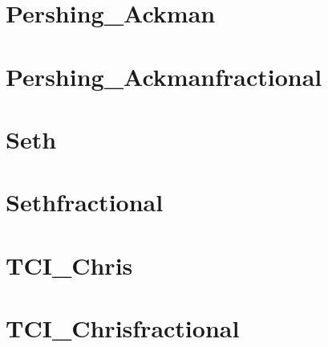 \documentclass[letterpaper,10pt,english]{sphinxmanual}
\begin{document}
\sphinxstepscope


\chapter{Pershing\_Ackman}
\label{\detokenize{Pershing_Ackman2021-09-30:pershing-ackman}}\label{\detokenize{Pershing_Ackman2021-09-30::doc}}
\noindent{}

\sphinxstepscope


\chapter{Pershing\_Ackmanfractional}
\label{\detokenize{Pershing_Ackmanfractional2021-09-30:pershing-ackmanfractional}}\label{\detokenize{Pershing_Ackmanfractional2021-09-30::doc}}
\noindent{}

\sphinxstepscope


\chapter{Seth}
\label{\detokenize{Seth2021-09-30:seth}}\label{\detokenize{Seth2021-09-30::doc}}
\noindent{}

\sphinxstepscope


\chapter{Sethfractional}
\label{\detokenize{Sethfractional2021-09-30:sethfractional}}\label{\detokenize{Sethfractional2021-09-30::doc}}
\noindent{}

\sphinxstepscope


\chapter{TCI\_Chris}
\label{\detokenize{TCI_Chris2021-09-30:tci-chris}}\label{\detokenize{TCI_Chris2021-09-30::doc}}
\noindent{}

\sphinxstepscope


\chapter{TCI\_Chrisfractional}
\label{\detokenize{TCI_Chrisfractional2021-09-30:tci-chrisfractional}}\label{\detokenize{TCI_Chrisfractional2021-09-30::doc}}
\noindent{}



\renewcommand{\indexname}{Index}
\printindex
\end{document}
